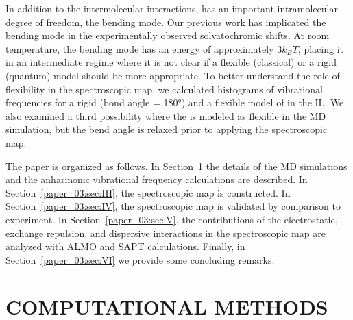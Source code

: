\documentclass[%
  class = book,%
  crop = false,%
  float = true,%
  multi = true,%
  preview = false,%
]{standalone}
\newcommand{\caps}[1]{\uppercase{#1}}
\begin{document}
In addition to the intermolecular interactions,  has an important intramolecular degree of freedom, the bending mode. Our previous work\cite{Brinzer2015} has implicated the bending mode in the experimentally observed solvatochromic shifts. At room temperature, the bending mode has an energy of approximately \(3k_{B}T\), placing it in an intermediate regime where it is not clear if a flexible (classical) or a rigid (quantum) model should be more appropriate. To better understand the role of  flexibility in the spectroscopic map, we calculated histograms of vibrational frequencies for a rigid (bond angle = \ang{180}) and a flexible model of  in the \ce{[C4C1im][PF6]} IL. We also examined a third possibility where the  is modeled as flexible in the MD simulation, but the bend angle is relaxed prior to applying the spectroscopic map.

The paper is organized as follows. In Section~\ref{paper_03:sec:II} the details of the MD simulations and the anharmonic vibrational frequency calculations are described. In Section~\ref{paper_03:sec:III}, the spectroscopic map is constructed. In Section~\ref{paper_03:sec:IV}, the spectroscopic map is validated by comparison to experiment. In Section~\ref{paper_03:sec:V}, the contributions of the electrostatic, exchange repulsion, and dispersive interactions in the spectroscopic map are analyzed with ALMO and SAPT calculations. Finally, in Section~\ref{paper_03:sec:VI} we provide some concluding remarks.

\section{\texorpdfstring{\caps{Computational Methods}}{Computational Methods}}
\label{paper_03:sec:II}
\end{document}
